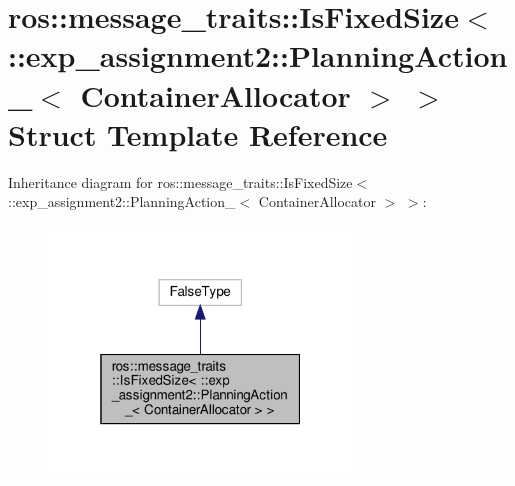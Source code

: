 \hypertarget{structros_1_1message__traits_1_1IsFixedSize_3_01_1_1exp__assignment2_1_1PlanningAction___3_01ContainerAllocator_01_4_01_4}{}\section{ros\+:\+:message\+\_\+traits\+:\+:Is\+Fixed\+Size$<$ \+:\+:exp\+\_\+assignment2\+:\+:Planning\+Action\+\_\+$<$ Container\+Allocator $>$ $>$ Struct Template Reference}
\label{structros_1_1message__traits_1_1IsFixedSize_3_01_1_1exp__assignment2_1_1PlanningAction___3_01ContainerAllocator_01_4_01_4}


Inheritance diagram for ros\+:\+:message\+\_\+traits\+:\+:Is\+Fixed\+Size$<$ \+:\+:exp\+\_\+assignment2\+:\+:Planning\+Action\+\_\+$<$ Container\+Allocator $>$ $>$\+:
\nopagebreak
\begin{figure}[H]
\begin{center}
\leavevmode
\includegraphics[width=229pt]{structros_1_1message__traits_1_1IsFixedSize_3_01_1_1exp__assignment2_1_1PlanningAction___3_01Cone5f4d94f88b02fe75b133444aa7e0333}
\end{center}
\end{figure}


